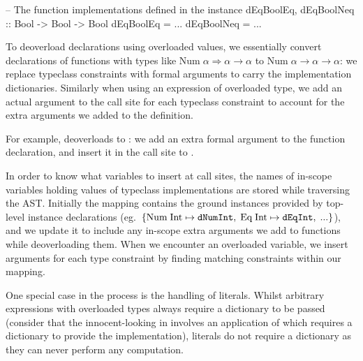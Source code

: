 \documentclass[dissertation.tex]{subfiles}
\begin{document}
{{\begin{haskellfigure}
        -- The function implementations defined in the instance
        dEqBoolEq, dEqBoolNeq :: Bool -> Bool -> Bool
        dEqBoolEq = ...
        dEqBoolNeq = ...
        \end{haskellfigure}


        To deoverload declarations using overloaded values, we essentially convert declarations of functions with types
        like \(\text{Num}\;\alpha\Rightarrow\alpha\rightarrow\alpha\) to
        \(\text{Num}\;\alpha\rightarrow\alpha\rightarrow\alpha\): we replace typeclass constraints with formal arguments
        to carry the implementation dictionaries. Similarly when using an expression of overloaded type, we add an
        actual argument to the call site for each typeclass constraint to account for the extra arguments we added to
        the definition.
        
        For example,  deoverloads to : we add an extra
        formal argument to the function declaration, and insert it in the call site to \haskell{(+)}.

        In order to know what variables to insert at call sites, the names of in-scope variables holding values of
        typeclass implementations are stored while traversing the AST. Initially the mapping contains the ground
        instances provided by top-level instance declarations (eg.\
        \(\{\text{Num\;Int}\mapsto\texttt{dNumInt},\;\text{Eq\;Int}\mapsto\texttt{dEqInt},\;...\}\)), and we update
        it to include any in-scope extra arguments we add to functions while deoverloading them. When we encounter
        an overloaded variable, we insert arguments for each type constraint by finding matching constraints within
        our mapping.

        One special case in the process is the handling of literals. Whilst arbitrary expressions with overloaded
        types always require a dictionary to be passed (consider that the innocent-looking \haskell{x} in
        \haskell{let x = 1 + 2 in x} involves an application of \haskell{(+)} which requires a dictionary to provide
        the implementation), literals do not require a dictionary as they can never perform any computation.

    }
}
\end{document}
